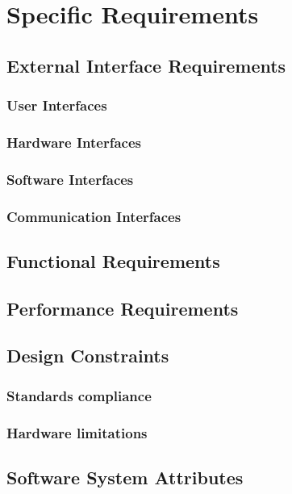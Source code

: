 \documentclass{article}
\begin{document}
\section{Specific Requirements}

\subsection{External Interface Requirements}
\subsubsection{User Interfaces}
\subsubsection{Hardware Interfaces}
\subsubsection{Software Interfaces}
\subsubsection{Communication Interfaces}

\subsection{Functional Requirements}

\subsection{Performance Requirements}

\subsection{Design Constraints}
\subsubsection{Standards compliance}
\subsubsection{Hardware limitations}

\subsection{Software System Attributes}
\end{document}
